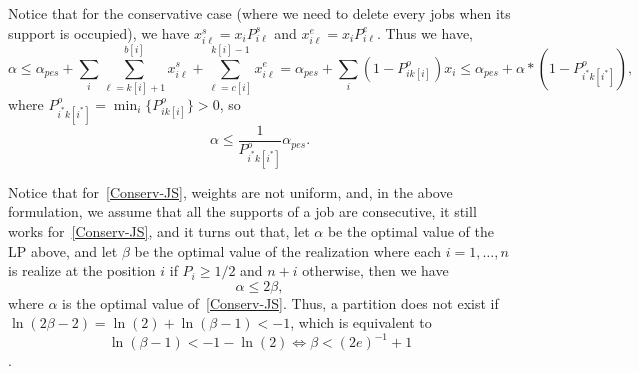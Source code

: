 \documentclass{article}
\begin{document}
Notice that for the conservative case (where we need to delete every jobs when its support is occupied), we have 
$x_{i\ell}^{s}=x_i P_{i\ell}^s $ and $x_{i\ell}^{e}=x_i P_{i\ell}^e$.
Thus we have,
\[\alpha\leq \alpha_{pes}+\sum_{i}\sum_{\ell=k[i]+1}^{b[i]}x_{i\ell}^{s}+\sum_{\ell=c[i]}^{k[i]-1}x_{i\ell}^{e} = \alpha_{pes}+\sum_{i}(1-P_{ik[i]}^o)x_i\leq \alpha_{pes}+\alpha*(1-P_{i^*k[i^*]}^{o}),\]
where $P_{i^*k[i^*]}^{o}=\min_i \{P_{ik[i]}^o\}>0$, so 
\[\alpha\leq \frac{1}{P_{i^*k[i^*]}^{o}}\alpha_{pes}.\]

Notice that for~\eqref{Conserv-JS}, weights are not uniform, 
and, in the above formulation, we assume that all the supports of a job are consecutive, it still works for~\eqref{Conserv-JS}, and it turns out that, let $\alpha$ be the optimal value of the LP above, 
and let $\beta$ be the optimal value of the realization where each $i=1,\ldots,n$ is realize at the position $i$ if $P_{i}\geq 1/2$ and $n+i$ otherwise, then 
we have
\[\alpha\leq 2\beta,\]
where $\alpha$ is the optimal value of~\eqref{Conserv-JS}.
Thus, a partition does not exist if $\ln(2\beta-2) = \ln(2)+\ln(\beta-1)< -1$, which is equivalent to 
\[\ln(\beta-1)<-1-\ln(2)\iff \beta <(2e)^{-1}+1\].
\end{document}
